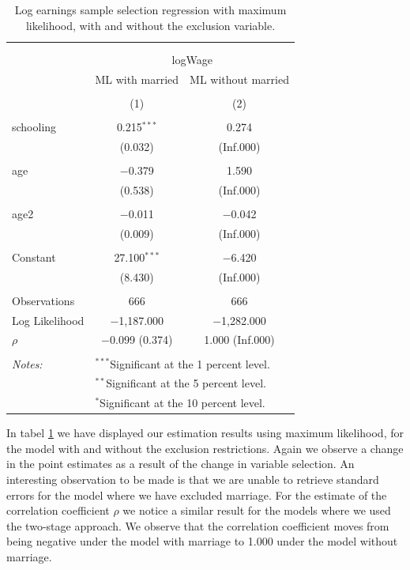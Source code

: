 \documentclass[
]{article}
\begin{document}
\begin{table}[!htbp] \centering 
  \caption{Log earnings sample selection regression with maximum likelihood, 
          with and without the exclusion variable.} 
  \label{tab:q1_e} 
\small 
\begin{tabular}{@{\extracolsep{5pt}}lcc} 
\\[-1.8ex]\hline 
\hline \\[-1.8ex] 
\\[-1.8ex] & \multicolumn{2}{c}{logWage} \\ 
 & ML with married & ML without married \\ 
\\[-1.8ex] & (1) & (2)\\ 
\hline \\[-1.8ex] 
 schooling & 0.215$^{***}$ & 0.274 \\ 
  & (0.032) & (Inf.000) \\ 
  & & \\ 
 age & $-$0.379 & 1.590 \\ 
  & (0.538) & (Inf.000) \\ 
  & & \\ 
 age2 & $-$0.011 & $-$0.042 \\ 
  & (0.009) & (Inf.000) \\ 
  & & \\ 
 Constant & 27.100$^{***}$ & $-$6.420 \\ 
  & (8.430) & (Inf.000) \\ 
  & & \\ 
Observations & 666 & 666 \\ 
Log Likelihood & $-$1,187.000 & $-$1,282.000 \\ 
$\rho$ & $-$0.099  (0.374) & 1.000  (Inf.000) \\ 
\hline \\[-1.8ex] 
\textit{Notes:} & \multicolumn{2}{l}{$^{***}$Significant at the 1 percent level.} \\ 
 & \multicolumn{2}{l}{$^{**}$Significant at the 5 percent level.} \\ 
 & \multicolumn{2}{l}{$^{*}$Significant at the 10 percent level.} \\ 
\end{tabular} 
\end{table}

In tabel \ref{tab:q1_e} we have displayed our estimation results using
maximum likelihood, for the model with and without the exclusion
restrictions. Again we observe a change in the point estimates as a
result of the change in variable selection. An interesting observation
to be made is that we are unable to retrieve standard errors for the
model where we have excluded marriage. For the estimate of the
correlation coefficient \(\rho\) we notice a similar result for the
models where we used the two-stage approach. We observe that the
correlation coefficient moves from being negative under the model with
marriage to 1.000 under the model without marriage.
\end{document}
